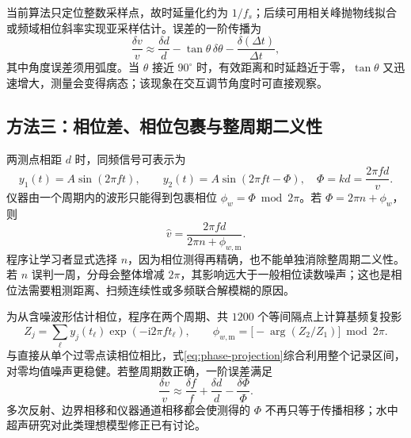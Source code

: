 \documentclass[UTF8,a4paper,zihao=-4]{ctexart}
\begin{document}
当前算法只定位整数采样点，故时延量化约为 $1/f_s$；后续可用相关峰抛物线拟合或频域相位斜率实现亚采样估计。误差的一阶传播为
\begin{equation}
 \frac{\delta v}{v}\approx
 \frac{\delta d}{d}-\tan\theta\,\delta\theta
 -\frac{\delta(\Delta t)}{\Delta t},
 \label{eq:dual-uncertainty}
\end{equation}
其中角度误差须用弧度。当 $\theta$ 接近 $90^\circ$ 时，有效距离和时延趋近于零，$\tan\theta$ 又迅速增大，测量会变得病态；该现象在交互调节角度时可直接观察。

\subsection{方法三：相位差、相位包裹与整周期二义性}
两测点相距 $d$ 时，同频信号可表示为
\begin{equation}
 y_1(t)=A\sin(2\pi ft),\qquad
 y_2(t)=A\sin(2\pi ft-\Phi),
 \quad \Phi=kd=\frac{2\pi fd}{v}.
 \label{eq:phase-signals}
\end{equation}
仪器由一个周期内的波形只能得到包裹相位 $\phi_w=\Phi\bmod 2\pi$。若 $\Phi=2\pi n+\phi_w$，则
\begin{equation}
 \hat v=\frac{2\pi fd}{2\pi n+\phi_{w,\mathrm m}}.
 \label{eq:phase-speed}
\end{equation}
程序让学习者显式选择 $n$，因为相位测得再精确，也不能单独消除整周期二义性。若 $n$ 误判一周，分母会整体增减 $2\pi$，其影响远大于一般相位读数噪声；这也是相位法需要粗测距离、扫频连续性或多频联合解模糊的原因。

为从含噪波形估计相位，程序在两个周期、共 $1200$ 个等间隔点上计算基频复投影
\begin{equation}
 Z_j=\sum_{\ell}y_j(t_\ell)\exp(-\mathrm i2\pi f t_\ell),
 \qquad
 \phi_{w,\mathrm m}=\bigl[-\arg(Z_2/Z_1)\bigr]\bmod2\pi.
 \label{eq:phase-projection}
\end{equation}
与直接从单个过零点读相位相比，式\eqref{eq:phase-projection}综合利用整个记录区间，对零均值噪声更稳健。若整周期数正确，一阶误差满足
\begin{equation}
 \frac{\delta v}{v}\approx
 \frac{\delta f}{f}+\frac{\delta d}{d}-\frac{\delta\Phi}{\Phi}.
 \label{eq:phase-uncertainty}
\end{equation}
多次反射、边界相移和仪器通道相移都会使测得的 $\Phi$ 不再只等于传播相移；水中超声研究对此类理想模型修正已有讨论\cite{water2020,sjtuultra}。
\end{document}
